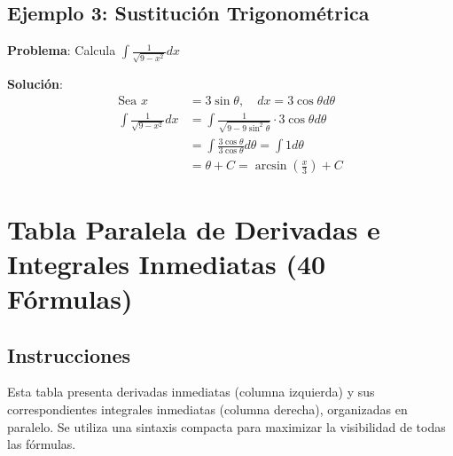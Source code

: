 \documentclass{article}
\newcommand{\formula}[1]{\ensuremath{#1}}
\begin{document}
\subsection{Ejemplo 3: Sustitución Trigonométrica}
\begin{tcolorbox}[colback=gray!5!white, colframe=black]
\textbf{Problema}: Calcula \formula{\int \frac{1}{\sqrt{9-x^2}} dx}

\textbf{Solución}:
\begin{align*}
\text{Sea } x &= 3\sin\theta, \quad dx = 3\cos\theta d\theta \\
\int \frac{1}{\sqrt{9-x^2}} dx &= \int \frac{1}{\sqrt{9-9\sin^2\theta}} \cdot 3\cos\theta d\theta \\
&= \int \frac{3\cos\theta}{3\cos\theta} d\theta = \int 1 d\theta \\
&= \theta + C = \arcsin\left(\frac{x}{3}\right) + C
\end{align*}
\end{tcolorbox}

\newpage %
\section{Tabla Paralela de Derivadas e Integrales Inmediatas (40 Fórmulas)}
\label{sec:tabla_paralela_completa_parte1}

\subsection*{Instrucciones}
Esta tabla presenta derivadas inmediatas (columna izquierda) y sus correspondientes integrales inmediatas (columna derecha), organizadas en paralelo. Se utiliza una sintaxis compacta para maximizar la visibilidad de todas las fórmulas.
\end{document}
